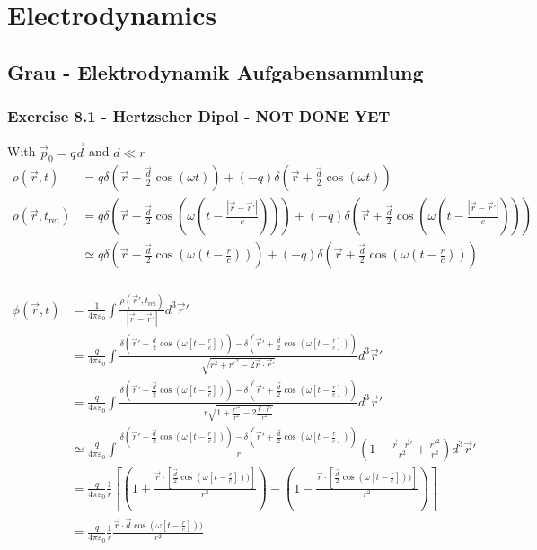 \documentclass[10pt,a4paper]{book}
\theoremstyle{definition}
\begin{document}
\chapter{Electrodynamics}
\section{{\sc Grau} - Elektrodynamik Aufgabensammlung}
\subsection{Exercise 8.1 - Hertzscher Dipol - NOT DONE YET}
With $\vec{p}_0=q\vec{d}$ and $d\ll r$
\begin{align}
\rho(\vec{r},t)
&=
q\delta(\vec{r}-\frac{\vec{d}}{2} \cos(\omega t))+
(-q)\delta(\vec{r}+\frac{\vec{d}}{2} \cos(\omega t))\\
\rho(\vec{r},t_\text{ret})
&=
q\delta(\vec{r}-\frac{\vec{d}}{2} \cos(\omega (t-\frac{|\vec{r}-\vec{r}'|}{c})))+
(-q)\delta(\vec{r}+\frac{\vec{d}}{2} \cos(\omega (t-\frac{|\vec{r}-\vec{r}'|}{c})))\\
&\simeq
q\delta(\vec{r}-\frac{\vec{d}}{2} \cos(\omega (t-\frac{r}{c})))+
(-q)\delta(\vec{r}+\frac{\vec{d}}{2} \cos(\omega (t-\frac{r}{c})))\\
\end{align}

\begin{align}
\phi(\vec{r},t)
&=\frac{1}{4\pi\varepsilon_0}\int\frac{\rho(\vec{r}',t_\text{ret})}{|\vec{r}-\vec{r}'|}d^3\vec{r}'\\
&=\frac{q}{4\pi\varepsilon_0}\int\frac{\delta(\vec{r}'-\frac{\vec{d}}{2}\cos(\omega [t-\frac{r}{c}]))-\delta(\vec{r}'+\frac{\vec{d}}{2}\cos(\omega [t-\frac{r}{c}]))}{\sqrt{r^2+r'^2-2\vec{r}\cdot\vec{r}'}}d^3\vec{r}'\\
&=\frac{q}{4\pi\varepsilon_0}\int\frac{\delta(\vec{r}'-\frac{\vec{d}}{2}\cos(\omega [t-\frac{r}{c}]))-\delta(\vec{r}'+\frac{\vec{d}}{2}\cos(\omega [t-\frac{r}{c}]))}{r\sqrt{1+\frac{r'^2}{r^2}-2\frac{\vec{r}\cdot\vec{r}'}{r^2}}}d^3\vec{r}'\\
&\simeq\frac{q}{4\pi\varepsilon_0}\int\frac{\delta(\vec{r}'-\frac{\vec{d}}{2}\cos(\omega [t-\frac{r}{c}]))-\delta(\vec{r}'+\frac{\vec{d}}{2}\cos(\omega [t-\frac{r}{c}]))}{r}\left(1+\frac{\vec{r}\cdot\vec{r}'}{r^2}+\frac{r'^2}{r^2}\right)d^3\vec{r}'\\
&=\frac{q}{4\pi\varepsilon_0}\frac{1}{r}\left[\left(1+\frac{\vec{r}\cdot\left[\frac{\vec{d}}{2}\cos(\omega [t-\frac{r}{c}]))\right]}{r^2}\right)-\left(1-\frac{\vec{r}\cdot\left[\frac{\vec{d}}{2}\cos(\omega [t-\frac{r}{c}]))\right]}{r^2}\right)\right]\\
&=\frac{q}{4\pi\varepsilon_0}\frac{1}{r} \frac{\vec{r}\cdot\vec{d}\cos(\omega [t-\frac{r}{c}]))}{r^2}\\
\end{align}
\end{document}

